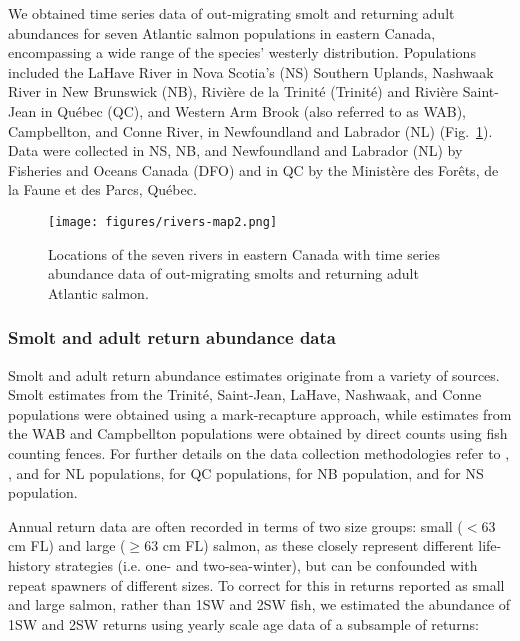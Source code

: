 \documentclass[12pt]{article}
\begin{document}
We obtained time series data of out-migrating smolt and returning adult
abundances for seven Atlantic salmon populations in eastern Canada, encompassing a
wide range of the species' westerly distribution.
Populations included the LaHave River in Nova Scotia's (NS) Southern Uplands,
Nashwaak River in New Brunswick (NB), Rivi\`{e}re de la Trinit\'{e} (Trinit\'{e}) and
Rivi\`{e}re Saint-Jean in Qu\'{e}bec (QC), and Western Arm Brook (also referred to as WAB),
Campbellton, and Conne River, in Newfoundland and Labrador (NL) (Fig.~\ref{fig:map}).
Data were collected in NS, NB, and Newfoundland
and Labrador (NL) by Fisheries and Oceans Canada (DFO) and in QC
by the Minist\`{e}re des For\^{e}ts, de la Faune et des Parcs, Qu\'{e}bec.

\begin{figure}[htbp] \centering
    \texttt{[image: figures/rivers-map2.png]}
    \caption{Locations of the seven rivers in eastern Canada with time series abundance data of out-migrating smolts and
    returning adult Atlantic salmon.} \label{fig:map}
\end{figure}

\subsubsection*{Smolt and adult return abundance data}

Smolt and adult return abundance estimates originate from a variety of
sources. Smolt estimates from the Trinit\'{e}, Saint-Jean, LaHave, Nashwaak,
and Conne populations were obtained using a mark-recapture approach, while
estimates from the WAB and Campbellton populations were obtained by direct
counts using fish counting fences.
For further details on the data collection methodologies refer to
\citet{Dempson1991}, \citet{Schwarz1994}, and \citet{Venoitt2018} for NL populations,
\citet{April2018}  for QC populations,
\citet{Jones2014} for NB population,
and \citet{Gibson2009} for NS population.

Annual return data are often recorded in terms of two size groups: small ($< 63$ cm
FL) and large ($\geq 63$ cm FL) salmon, as these closely represent different
life-history strategies (i.e. one- and two-sea-winter), but can be confounded with repeat
spawners of different sizes. To correct for this in returns
reported as small and large salmon, rather than 1SW and 2SW fish, we estimated the abundance
of 1SW and 2SW returns using yearly scale age data of a subsample of returns:
\end{document}
